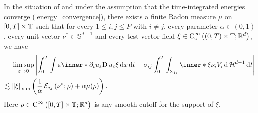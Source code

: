 \begin{proposition}
	\label{convergence_of_velocity_multiphase}
	In the situation of  and under 
	the assumption that the time-integrated energies converge 
	(\ref{energy_convergence}), there exists a finite Radon measure $ \mu $ on 
	$ [ 0 , T ] \times \operatorname{\mathbb{T}} $ such that for every $ 1 \leq i , j \leq P $ 
	with $ i \neq j $, every parameter $ \alpha \in ( 0 , 1 ) $, every unit 
	vector $ \nu^{ \ast } \in \mathbb{ S }^{ d - 1 } $ and every test vector 
	field $ \xi \in \operatorname{C}_{ \mathrm{c} }^{ \infty } \left( ( 0 , T ) \times 
	\operatorname{\mathbb{T}} ; \mathbb{ R }^{ d } \right) $, we have
	\begin{align*}
		& \limsup_{ \varepsilon \to 0 }
		\abs{
			\int_{ 0 }^{ T }
			\int
			\varepsilon
			\inner*{ \partial_{ t } u_{ \varepsilon } }{ \diff u_{ 
					\varepsilon } \xi }
			\dd{ x }
			\dd{ t }
			-
			\sigma_{ i j }
			\int_{ 0 }^{ T }
			\int_{ \Sigma_{ i j } }
			\inner*{ \xi }{ \nu_{ i } } V_{ i }
			\dd{ \hm^{ d - 1 } }
			\dd{ t }
		}
		\\
		\lesssim{} &
		\norm{ \xi }_{ \mathrm{sup} }
		\left(
		\frac{ 1 }{ \alpha } \tilt_excess_{ i j } \left( \nu^{ \ast } ; 
		\rho \right) 
		+ \alpha \mu ( \rho ) 
		\right).
	\end{align*}
	Here $ \rho \in \operatorname{C}^{ \infty } \left( [ 0 , T ] \times \operatorname{\mathbb{T}} ;  
	\mathbb{ R }^{ d } 
	\right) $ is any 
	smooth cutoff for the support of $ \xi $.
\end{proposition}

